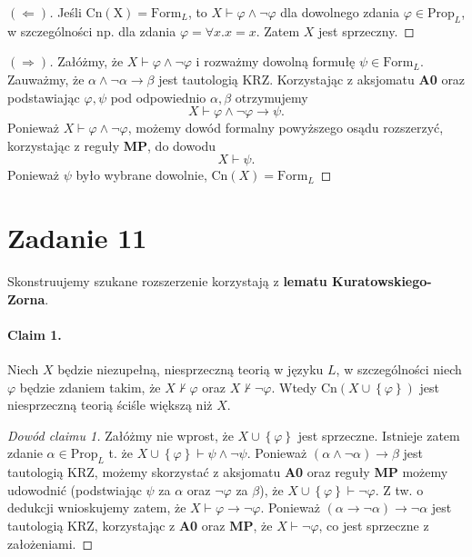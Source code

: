 \begin{proof}[\((\Leftarrow)\)]
    Jeśli \( \mathrm{Cn(X)} = \mathrm{Form}_L \), to \( X \vdash \varphi \wedge \neg\varphi \) dla dowolnego zdania \( \varphi \in \mathrm{Prop}_L \), w szczególności np. dla zdania \( \varphi = \forall x. x = x \). Zatem \( X \) jest sprzeczny.
\end{proof}

\begin{proof}[\( (\Rightarrow) \)]
Załóżmy, że \( X \vdash \varphi \wedge \neg \varphi \) i rozważmy dowolną formułę \( \psi \in \mathrm{Form}_L \).
Zauważmy, że \( \alpha \wedge \neg \alpha \to \beta \) jest tautologią KRZ. Korzystając z aksjomatu \textbf{A0} oraz podstawiając \( \varphi, \psi \) pod odpowiednio \( \alpha, \beta \) otrzymujemy
\[ 
    X \vdash \varphi \wedge \neg \varphi \to \psi.
\]
Ponieważ \( X \vdash \varphi \wedge \neg \varphi \), możemy dowód formalny powyższego osądu rozszerzyć, korzystając z reguły \textbf{MP}, do dowodu
\[ 
    X \vdash \psi. 
\]
Ponieważ \( \psi \) było wybrane dowolnie, \( \mathrm{Cn}(X) = \mathrm{Form}_L \)
\end{proof}

\section*{Zadanie 11}

Skonstruujemy szukane rozszerzenie korzystają z \textbf{lematu Kuratowskiego-Zorna}. 

\paragraph{Claim 1.} Niech \( X \) będzie niezupełną, niesprzeczną teorią w języku \( L \), w szczególności niech \( \varphi \) będzie zdaniem takim, że \( X \not\vdash \varphi \) oraz \( X \not\vdash \neg\varphi \). Wtedy \( \mathrm{Cn}(X \cup \left\{ \varphi \right\}) \) jest niesprzeczną teorią ściśle większą niż \( X \).

\begin{proof}[Dowód claimu 1]
Załóżmy nie wprost, że \( X \cup \left\{ \varphi \right\} \) jest sprzeczne. Istnieje zatem zdanie \( \alpha \in \mathrm{Prop}_L \) t. że \( X \cup \left\{ \varphi \right\} \vdash \psi \wedge \neg \psi \). Ponieważ \( (\alpha \wedge \neg \alpha) \to \beta \) jest tautologią KRZ, możemy skorzystać z aksjomatu \textbf{A0} oraz reguły \textbf{MP} możemy udowodnić (podstwiając \( \psi \) za \( \alpha \) oraz \( \neg\varphi \) za \( \beta \)), że \( X \cup \left\{ \varphi \right\} \vdash \neg\varphi\). Z tw. o dedukcji wnioskujemy zatem, że \( X \vdash \varphi \to \neg\varphi \). Ponieważ \( (\alpha \to \neg\alpha) \to \neg\alpha \) jest tautologią KRZ, korzystając z \textbf{A0} oraz \textbf{MP}, że \( X \vdash \neg\varphi \), co jest sprzeczne z założeniami. 
\end{proof}


